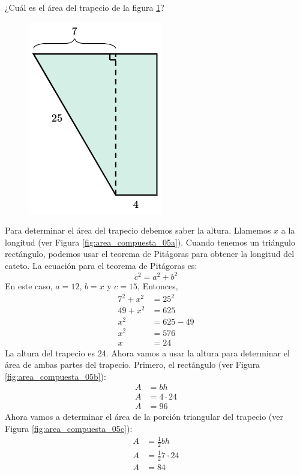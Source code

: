 ¿Cuál es el \'area del trapecio de la figura \ref{fig:area_compuesta_05}?

\begin{figure}[H]
    \centering
    \includegraphics[width=0.16\linewidth]{../images/area_compuesta_05.png}
    \caption{}
    \label{fig:area_compuesta_05}
\end{figure}
\begin{solutionbox}{15cm}

    \begin{minipage}{0.7\textwidth}
        Para determinar el área del trapecio debemos saber la altura. Llamemos $x$ a la longitud (ver Figura \ref{fig:area_compuesta_05a}).
        Cuando tenemos un triángulo rectángulo, podemos usar el teorema de Pitágoras para obtener la longitud del cateto.
        La ecuación para el teorema de Pitágoras es:
        \[c^2=a^2+b^2\]
        En este caso, $a=12$, $b=x$ y $c=15$, Entonces,
        \begin{align*}
            7^2+x^2 & =25^2   \\
            49+x^2  & =625    \\
            x^2     & =625-49 \\
            x^2     & =576    \\
            x       & =24
        \end{align*}
        La altura del trapecio es 24. Ahora vamos a usar la altura para determinar el área de ambas partes del trapecio.
        Primero, el rectángulo (ver Figura \ref{fig:area_compuesta_05b}):
        \begin{align*}
            A & =bh        \\
            A & =4\cdot 24 \\
            A & =96
        \end{align*}
        Ahora vamos a determinar el área de la porción triangular del trapecio (ver Figura \ref{fig:area_compuesta_05c}):
        \begin{align*}
            A & =\frac{1}{2}bh        \\
            A & =\frac{1}{2}7\cdot 24 \\
            A & =84
        \end{align*}

\end{minipage}
\end{solutionbox}
